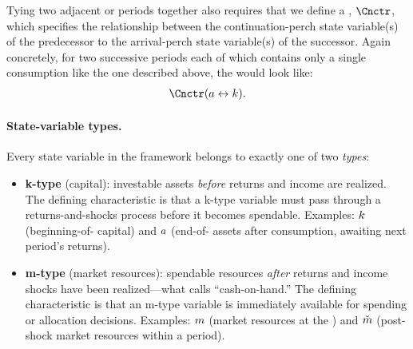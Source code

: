 Tying two adjacent {\stgs} or periods together also requires that we define a {\Cnct}, ${\Cnctr}$, which specifies the relationship between the continuation-perch state variable(s) of the predecessor to the arrival-perch state variable(s) of the successor. Again concretely, for two successive periods each of which contains only a single consumption {\stg} like the one described above, the {\Cnct} would look like:
  \begin{equation}\begin{gathered}\begin{aligned} \label{eq:last-stg-v-is-end-prd-v} 
        \Cnctr(\aNrm \leftrightarrow \kNrm).
      \end{aligned}\end{gathered}\end{equation}

\hypertarget{state-variable-types}{}
\paragraph{State-variable types.}
Every state variable in the framework belongs to exactly one of two
\textit{types}:

\begin{itemize}
  \item \textbf{k-type} (capital): investable assets \textit{before}
    returns and income are realized. The defining characteristic is that
    a k-type variable must pass through a returns-and-shocks process
    before it becomes spendable. Examples: $k$
    (beginning-of-{\interval} capital) and $a$ (end-of-{\interval}
    assets after consumption, awaiting next period's returns).

  \item \textbf{m-type} (market resources): spendable resources
    \textit{after} returns and income shocks have been
    realized---what \citet{deatonUnderstandingC} calls ``cash-on-hand.''
    The defining characteristic is that an m-type variable is immediately
    available for spending or allocation decisions. Examples: $m$
    (market resources at the {\Decision} {\prch}) and $\check{m}$
    (post-shock market resources within a period).
\end{itemize}

